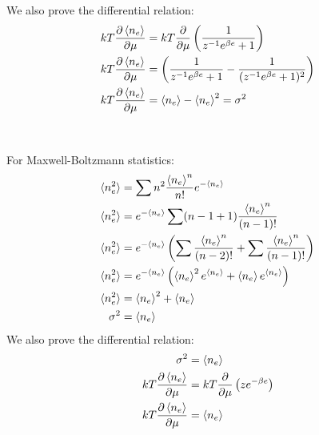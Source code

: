 \documentclass[a4paper,11pt]{article}
\numberwithin{equation}{section}
\begin{document}
We also prove the differential relation:
\begin{align}
 kT \frac{\partial \braket{n_e}}{\partial \mu} &= kT \frac{\partial}{\partial \mu}\left(\frac{1}{z^{-1}e^{\beta e}+1} \right)\\
 kT \frac{\partial \braket{n_e}}{\partial \mu} &= \left(\frac{1}{z^{-1}e^{\beta e}+1}-\frac{1}{(z^{-1}e^{\beta e}+1)^2} \right)\\
 kT \frac{\partial \braket{n_e}}{\partial \mu} &= \braket{n_e}-\braket{n_e}^2 = \sigma^2
\end{align}
\\ \\
For Maxwell-Boltzmann statistics:
\begin{align}
 \braket{n_e^2} &= \sum n^2\frac{\braket{n_e}^n}{n!}e^{-\braket{n_e}}\\
 \braket{n_e^2} &= e^{-\braket{n_e}}\sum (n-1+1)\frac{\braket{n_e}^n}{(n-1)!}\\
 \braket{n_e^2} &= e^{-\braket{n_e}}\left( \sum \frac{\braket{n_e}^n}{(n-2)!} +
                                             \sum \frac{\braket{n_e}^n}{(n-1)!}\right)\\
 \braket{n_e^2} &= e^{-\braket{n_e}}\left( \braket{n_e}^2e^{\braket{n_e}}+\braket{n_e} e^{\braket{n_e}} \right)\\
 \braket{n_e^2} &= \braket{n_e}^2+\braket{n_e}\\
 \sigma^2 &= \braket{n_e}
\end{align}
We also prove the differential relation:
\begin{align}
 \sigma^2 &= \braket{n_e}\\
 kT \frac{\partial \braket{n_e}}{\partial \mu} &= kT \frac{\partial}{\partial \mu}\left(ze^{-\beta e} \right)\\
 kT \frac{\partial \braket{n_e}}{\partial \mu} &= \braket{n_e}
\end{align}
\\
\end{document}
